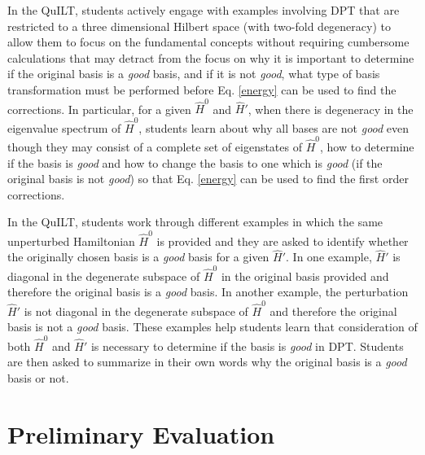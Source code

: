 \documentclass[aps,pra,showpacs,showkeys,twocolumn,groupedaddress]{revtex4-1}
\begin{document}
In the QuILT, students actively engage with examples involving DPT that are restricted to a three dimensional Hilbert space (with two-fold degeneracy) to allow them to focus on the fundamental concepts without requiring cumbersome calculations that may detract from the focus on why it is important to determine if the original basis is a {\it good} basis, and if it is not {\it good}, what type of basis transformation must be performed before Eq. \ref{energy}  can be used to find the corrections.  In particular, for a given $\hat{H}^0$ and $\hat{H}'$, when there is degeneracy in the eigenvalue spectrum of $\hat{H}^0$, students learn about why all bases are not {\it good} even though they may consist of a complete set of eigenstates of $\hat{H}^0$,  how to determine if the basis is {\it good} and how to change the basis to one which is {\it good} (if the original basis is not {\it good}) so that Eq. \ref{energy} can be used to find the first order corrections. 

In the QuILT, students work through different examples in which the same unperturbed Hamiltonian $\hat{H}^0$ is provided and they are asked to identify whether the originally chosen basis is a {\it good} basis for a given $\hat{H}'$.  In one example, $\hat{H}'$ is diagonal in the degenerate subspace of $\hat{H}^0$ in the original basis provided and therefore the original basis is a {\it good} basis.  In another example, %
the perturbation $\hat{H}'$ is not diagonal in the degenerate subspace of $\hat{H}^0$ and therefore the original basis is not a {\it good} basis.  
These examples help students learn that consideration of both $\hat{H}^0$ and $\hat{H}'$ is necessary to determine if the basis is {\it good} in DPT. Students are then asked to summarize in their own words why the original basis is a {\it good} basis or not.

\vspace*{-.19in}
\section{Preliminary Evaluation}
\vspace*{-.11in}
\end{document}
